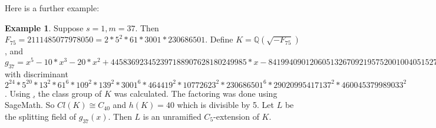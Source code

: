 \documentclass[12pt]{extarticle}
\newcommand{\Q}{\mathbb{Q}}
\newcommand{\<}{\langle}
\renewcommand{\>}{\rangle}
\theoremstyle{definition}
\newtheorem*{example}{Example}
\begin{document}
Here is a further example:
\begin{example}
Suppose $s=1, m= 37$. Then $F_{75} = 2111485077978050 = 2 * 5^2 * 61 * 3001 * 230686501$. Define $K = \Q(\sqrt{-F_{75}})$, and $g_{37} = x^5 - 10*x^3 - 20*x^2 + 445836923452397188907628180249985*x - 841994090120605132670921957520010040515272300004
$ with discriminant $2^{24} * 5^{20} * 13^2 * 61^6 * 109^2 * 139^2 * 3001^6 * 464419^2 * 10772623^2 * 230686501^6 * 29020995417137^2 * 460045379989033^2$. Using \href{http://magma.maths.usyd.edu.au/calc/}, the class group of $K$ was calculated. The factoring was done using SageMath. So $Cl(K) \cong C_{40} $ and $h(K) = 40$ which is divisible by 5. Let $L$ be the splitting field of $g_{37}(x)$. Then $L$ is an unramified $C_5$-extension of $K$. 
\end{example}
\end{document}
